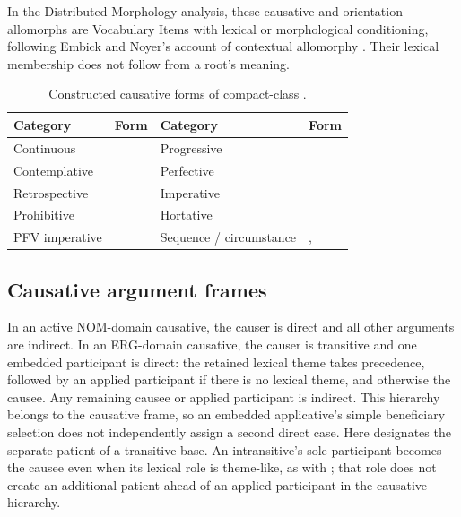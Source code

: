 In the Distributed Morphology analysis, these causative and orientation
allomorphs are Vocabulary Items with lexical or morphological conditioning,
following Embick and Noyer's account of contextual allomorphy
\cite[§2.3]{embicknoyer2007}. Their lexical membership does not follow from
a root's meaning.

\begin{table}[htbp]
\footnotesize
\caption{Constructed causative forms of compact-class .}
\label{tab:rhotic-causative-paradigm}
\begin{tabularx}{\textwidth}{L L L L}
\toprule
Category & Form & Category & Form \\
\midrule
Continuous &  & Progressive &  \\
Contemplative &  & Perfective &  \\
Retrospective &  & Imperative &  \\
Prohibitive &  & Hortative &  \\
PFV imperative &  & Sequence / circumstance & ,  \\
\bottomrule
\end{tabularx}
\end{table}

\subsection{Causative argument frames}

In an active NOM-domain causative, the causer is direct and all other arguments
are indirect. In an ERG-domain causative, the causer is transitive and one
embedded participant is direct: the retained lexical theme takes precedence,
followed by an applied participant if there is no lexical theme, and otherwise
the causee. Any remaining causee or applied participant is indirect. This
hierarchy belongs to the causative frame, so an embedded applicative's simple
beneficiary selection does not independently assign a second direct case.
Here  designates the separate patient of a transitive
base. An intransitive's sole participant becomes the causee even when its
lexical role is theme-like, as with  ; that role
does not create an additional patient ahead of an applied participant in the
causative hierarchy.

